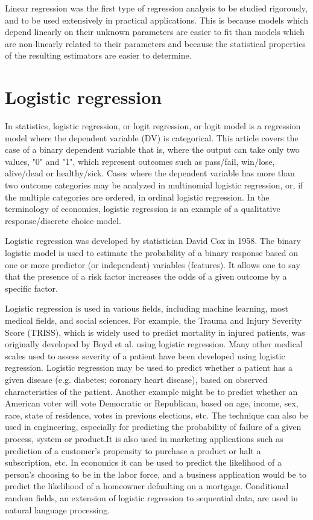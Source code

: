 \documentclass[sigconf]{acmart}
\begin{document}
Linear regression was the first type of regression analysis to be studied rigorously, and to be used extensively in practical applications. This is because models which depend linearly on their unknown parameters are easier to fit than models which are non-linearly related to their parameters and because the statistical properties of the resulting estimators are easier to determine.

\section{Logistic regression}
\par In statistics, logistic regression, or logit regression, or logit model is a regression model where the dependent variable (DV) is categorical. This article covers the case of a binary dependent variable that is, where the output can take only two values, "0" and "1", which represent outcomes such as pass/fail, win/lose, alive/dead or healthy/sick. Cases where the dependent variable has more than two outcome categories may be analyzed in multinomial logistic regression, or, if the multiple categories are ordered, in ordinal logistic regression. In the terminology of economics, logistic regression is an example of a qualitative response/discrete choice model.

Logistic regression was developed by statistician David Cox in 1958. The binary logistic model is used to estimate the probability of a binary response based on one or more predictor (or independent) variables (features). It allows one to say that the presence of a risk factor increases the odds of a given outcome by a specific factor.

Logistic regression is used in various fields, including machine learning, most medical fields, and social sciences. For example, the Trauma and Injury Severity Score (TRISS), which is widely used to predict mortality in injured patients, was originally developed by Boyd et al. using logistic regression. Many other medical scales used to assess severity of a patient have been developed using logistic regression. Logistic regression may be used to predict whether a patient has a given disease (e.g. diabetes; coronary heart disease), based on observed characteristics of the patient. Another example might be to predict whether an American voter will vote Democratic or Republican, based on age, income, sex, race, state of residence, votes in previous elections, etc. The technique can also be used in engineering, especially for predicting the probability of failure of a given process, system or product.It is also used in marketing applications such as prediction of a customer's propensity to purchase a product or halt a subscription, etc. In economics it can be used to predict the likelihood of a person's choosing to be in the labor force, and a business application would be to predict the likelihood of a homeowner defaulting on a mortgage. Conditional random fields, an extension of logistic regression to sequential data, are used in natural language processing.
\end{document}
